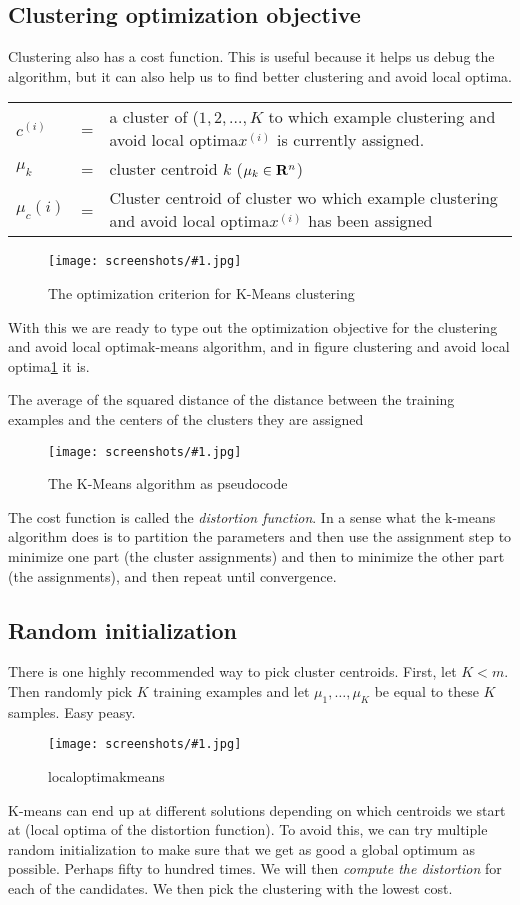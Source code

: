 \documentclass[a4, 12pt, english, USenglish]{scrreprt}
\newcommand{\screenshot}[2]{
\begin{figure}[htb]
\texttt{[image: screenshots/\#1.jpg]}
\label{#1}
\caption{#2}
\end{figure}}
\newcommand{\bb}[1]{\ensuremath{{\bf{#1}}}} %
\newcommand{\idx}[1]{{\em #1}\index{#1}}
\begin{document}
\subsection{Clustering optimization objective}


Clustering also has a cost function.  This is useful because it helps
us debug the algorithm, but it can also help us to find better
clustering and avoid local optima.
\begin{tabular}{lcl}
\(c^{(i)}\) &=&a cluster of (\(1,2, \ldots, K\) to which example
clustering and avoid local optima\(x^{(i)}\) is currently assigned. \\
\(\mu_k\) &=& cluster centroid \(k\) (\(\mu_k \in \bb{R}^n\)) \\
\(\mu_c(i)\) &=& Cluster centroid of cluster wo which example
clustering and avoid local optima\(x^{(i)}\) has been assigned\\
\end{tabular}


\screenshot{kmeanscriterion}{The optimization criterion for K-Means clustering}

With this we are ready to type out the optimization objective for the
clustering and avoid local optimak-means algorithm, and in figure
clustering and avoid local optima\ref{kmeanscriterion} it is.

The average of the squared distance of the distance between the
training examples and the centers of the clusters they are assigned

\screenshot{kmeansalgorithm}{The K-Means algorithm as pseudocode}

The cost function is called the \idx{distortion function}.  In a
sense what the k-means algorithm does is to partition the parameters
and then use the assignment step to minimize one part (the cluster
assignments) and then to minimize the other part (the assignments),
and then repeat until convergence.

\subsection{Random initialization}

There is one highly recommended way to pick cluster centroids.  First,
let \(K < m\).  Then randomly pick \(K\) training examples and let
\(\mu_1,\ldots,\mu_K\) be equal to these \(K\) samples.  Easy peasy.

\screenshot{localoptimakmeans}{localoptimakmeans}

K-means can end up at different solutions depending on which centroids
we start at (local optima of the distortion function).  To avoid this,
we can try multiple random initialization to make sure that we get as
good a global optimum as possible. Perhaps fifty to hundred times.  We
will then {\em compute the distortion} for each of the candidates.  We
then pick the clustering with the lowest cost.
\end{document}
